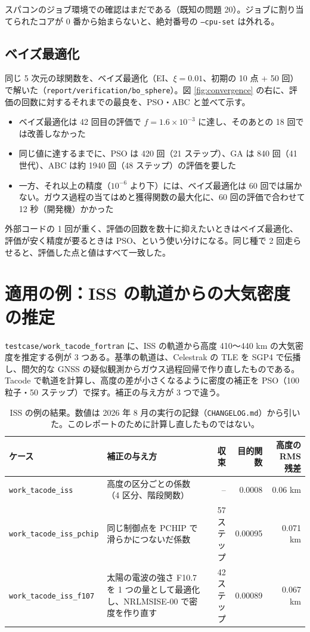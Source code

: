 \documentclass[11pt,a4paper,dvipdfmx]{jsarticle}
\begin{document}
スパコンのジョブ環境での確認はまだである（既知の問題 20）。ジョブに割り当てられたコアが 0 番から始まらないと、絶対番号の \texttt{--cpu-set} は外れる。

\subsection{ベイズ最適化}\label{sec:val-bo}

同じ 5 次元の球関数を、ベイズ最適化（EI、$\xi = 0.01$、初期の 10 点 + 50 回）で解いた（\texttt{report/verification/bo\_sphere}）。図 \ref{fig:convergence} の右に、評価の回数に対するそれまでの最良を、PSO・ABC と並べて示す。

\begin{itemize}
\item ベイズ最適化は 42 回目の評価で $f = 1.6 \times 10^{-3}$ に達し、そのあとの 18 回では改善しなかった
\item 同じ値に達するまでに、PSO は 420 回（21 ステップ）、GA は 840 回（41 世代）、ABC は約 1940 回（48 ステップ）の評価を要した
\item 一方、それ以上の精度（$10^{-6}$ より下）には、ベイズ最適化は 60 回では届かない。ガウス過程の当てはめと獲得関数の最大化に、60 回の評価で合わせて 12 秒（開発機）かかった
\end{itemize}

外部コードの 1 回が重く、評価の回数を数十に抑えたいときはベイズ最適化、評価が安く精度が要るときは PSO、という使い分けになる。同じ種で 2 回走らせると、評価した点と値はすべて一致した。

\section{適用の例：ISS の軌道からの大気密度の推定}\label{sec:application}

\texttt{testcase/work\_tacode\_fortran} に、ISS の軌道から高度 410〜440 km の大気密度を推定する例が 3 つある。基準の軌道は、Celestrak の TLE を SGP4 で伝播し、間欠的な GNSS の疑似観測からガウス過程回帰で作り直したものである。Tacode で軌道を計算し、高度の差が小さくなるように密度の補正を PSO（100 粒子・50 ステップ）で探す。補正の与え方が 3 つで違う。

\begin{table}[h]
\centering
\small
\begin{tabularx}{\linewidth}{lXrrr}
\toprule
ケース & 補正の与え方 & 収束 & 目的関数 & 高度の RMS 残差 \\
\midrule
\texttt{work\_tacode\_iss} & 高度の区分ごとの係数（4 区分、階段関数） & -- & 0.0008 & 0.06 km \\
\texttt{work\_tacode\_iss\_pchip} & 同じ制御点を PCHIP で滑らかにつないだ係数 & 57 ステップ & 0.00095 & 0.071 km \\
\texttt{work\_tacode\_iss\_f107} & 太陽の電波の強さ F10.7 を 1 つの量として最適化し、NRLMSISE-00 で密度を作り直す & 42 ステップ & 0.00089 & 0.067 km \\
\bottomrule
\end{tabularx}
\caption{ISS の例の結果。数値は 2026 年 8 月の実行の記録（\texttt{CHANGELOG.md}）から引いた。このレポートのために計算し直したものではない。}
\end{table}
\end{document}
